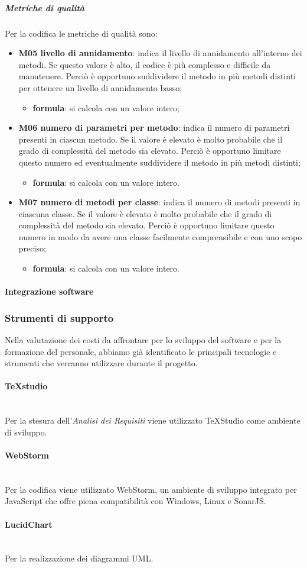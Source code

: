 		\subparagraph{Metriche di qualità}
		Per la codifica le metriche di qualità sono:
		\begin{itemize}
			\item \textbf{M05 livello di annidamento}: indica il livello di annidamento all'interno dei metodi. Se questo valore è alto, il codice è più complesso e difficile da manutenere. Perciò è opportuno suddividere il metodo in più metodi distinti per ottenere un livello di annidamento basso;
			\begin{itemize}
				\item[] \textbf{formula}: si calcola con un valore intero;
			\end{itemize}
			\item \textbf{M06 numero di parametri per metodo}: indica il numero di parametri presenti in ciascun metodo. Se il valore è elevato è molto probabile che il grado di complessità del metodo sia elevato. Perciò è opportuno limitare questo numero ed eventualmente suddividere il metodo in più metodi distinti;
			\begin{itemize}
				\item[] \textbf{formula}: si calcola con un valore intero.
			\end{itemize}
			\item \textbf{M07 numero di metodi per classe}: indica il numero di metodi presenti in ciascuna classe. Se il valore è elevato è molto probabile che il grado di complessità del metodo sia elevato. Perciò è opportuno limitare questo numero in modo da avere una classe facilmente comprensibile e con uno scopo preciso;
			\begin{itemize}
				\item[] \textbf{formula}: si calcola con un valore intero.
			\end{itemize}
		\end{itemize}
		\paragraph{Integrazione software}
		\subsubsection{Strumenti di supporto}
		Nella valutazione dei costi da affrontare per lo sviluppo del software e per la formazione del personale, abbiamo già identificato le principali tecnologie e strumenti che verranno utilizzare durante il progetto\glo.
		\paragraph{TeXstudio}\mbox{}\\ [1mm]
		Per la stesura dell'\textit{Analisi dei Requisiti} viene utilizzato TeXStudio come ambiente di sviluppo.
		\paragraph{WebStorm}\mbox{}\\ [1mm]
		Per la codifica viene utilizzato WebStorm, un ambiente di sviluppo integrato per JavaScript che offre piena compatibilità con Windows, Linux e SonarJS\glo.
		\paragraph{LucidChart}\mbox{}\\ [1mm]
		Per la realizzazione dei diagrammi UML\glo.	
